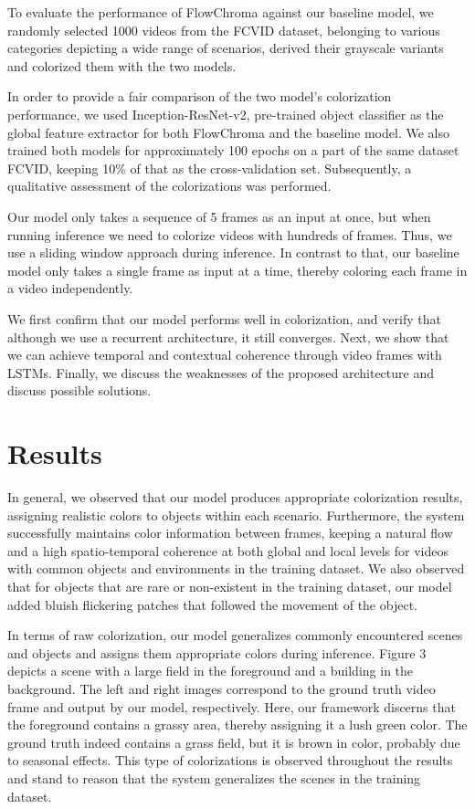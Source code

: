 \documentclass[10pt,twocolumn,letterpaper]{article}
\begin{document}
To evaluate the performance of FlowChroma against our baseline model, we randomly selected 1000 videos from the FCVID dataset, belonging to various categories depicting a wide range of scenarios, derived their grayscale variants and colorized them with the two models.

In order to provide a fair comparison of the two model’s colorization performance, we used Inception-ResNet-v2, pre-trained object classifier as the global feature extractor for both FlowChroma and the baseline model. We also trained both models for approximately 100 epochs on a part of the same dataset FCVID, keeping 10\% of that as the cross-validation set. Subsequently, a qualitative assessment of the colorizations was performed. 

Our model only takes a sequence of 5 frames as an input at once, but when running inference we need to colorize videos with hundreds of frames. Thus, we use a sliding window approach during inference. In contrast to that, our baseline model only takes a single frame as input at a time, thereby coloring each frame in a video independently.

We first confirm that our model performs well in colorization, and verify that although we use a recurrent architecture, it still converges. Next, we show that we can achieve temporal and contextual coherence through video frames with LSTMs. Finally, we discuss the weaknesses of the proposed architecture and discuss possible solutions.

\section{Results}
In general, we observed that our model produces appropriate colorization results, assigning realistic colors to objects within each scenario. Furthermore, the system successfully maintains color information between frames, keeping a natural flow and a high spatio-temporal coherence at both global and local levels for videos with common objects and environments in the training dataset. We also observed that for objects that are rare or non-existent in the training dataset, our model added bluish flickering patches that followed the movement of the object.

In terms of raw colorization, our model generalizes commonly encountered scenes and objects and assigns them appropriate colors during inference. Figure 3 depicts a scene with a large field in the foreground and a building in the background. The left and right images correspond to the ground truth video frame and output by our model, respectively. Here, our framework discerns that the foreground contains a grassy area, thereby assigning it a lush green color. The ground truth indeed contains a grass field, but it is brown in color, probably due to seasonal effects. This type of colorizations is observed throughout the results and stand to reason that the system generalizes the scenes in the training dataset.
\end{document}
